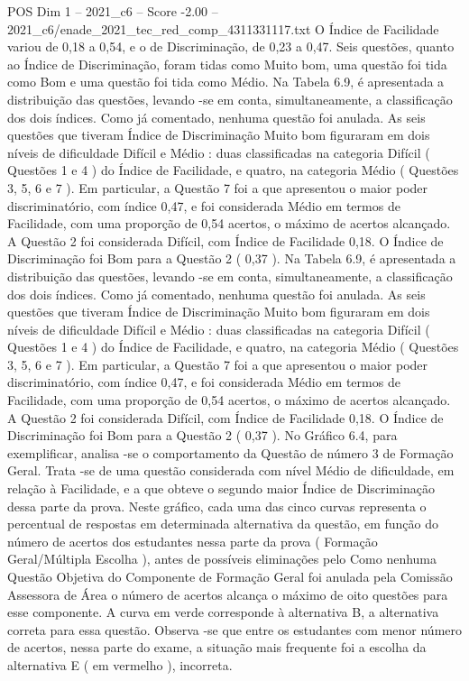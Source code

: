\begin{textsample}{POS Dim 1 – 2021\_c6 – Score -2.00 – 2021\_c6/enade\_2021\_tec\_red\_comp\_4311331117.txt}
O Índice de Facilidade variou de 0,18 a 0,54, e o de Discriminação, de 0,23 a 0,47.
Seis questões, quanto ao Índice de Discriminação, foram tidas como Muito bom, uma questão foi tida como Bom e uma questão foi tida como Médio.
Na Tabela 6.9, é apresentada a distribuição das questões, levando -se em conta, simultaneamente, a classificação dos dois índices.
Como já comentado, nenhuma questão foi anulada.
As seis questões que tiveram Índice de Discriminação Muito bom figuraram em dois níveis de dificuldade Difícil e Médio : duas classificadas na categoria Difícil ( Questões 1 e 4 ) do Índice de Facilidade, e quatro, na categoria Médio ( Questões 3, 5, 6 e 7 ).
Em particular, a Questão 7 foi a que apresentou o maior poder discriminatório, com índice 0,47, e foi considerada Médio em termos de Facilidade, com uma proporção de 0,54 acertos, o máximo de acertos alcançado.
A Questão 2 foi considerada Difícil, com Índice de Facilidade 0,18.
O Índice de Discriminação foi Bom para a Questão 2 ( 0,37 ).
Na Tabela 6.9, é apresentada a distribuição das questões, levando -se em conta, simultaneamente, a classificação dos dois índices.
Como já comentado, nenhuma questão foi anulada.
As seis questões que tiveram Índice de Discriminação Muito bom figuraram em dois níveis de dificuldade Difícil e Médio : duas classificadas na categoria Difícil ( Questões 1 e 4 ) do Índice de Facilidade, e quatro, na categoria Médio ( Questões 3, 5, 6 e 7 ).
Em particular, a Questão 7 foi a que apresentou o maior poder discriminatório, com índice 0,47, e foi considerada Médio em termos de Facilidade, com uma proporção de 0,54 acertos, o máximo de acertos alcançado.
A Questão 2 foi considerada Difícil, com Índice de Facilidade 0,18.
O Índice de Discriminação foi Bom para a Questão 2 ( 0,37 ).
No Gráfico 6.4, para exemplificar, analisa -se o comportamento da Questão de número 3 de Formação Geral.
Trata -se de uma questão considerada com nível Médio de dificuldade, em relação à Facilidade, e a que obteve o segundo maior Índice de Discriminação dessa parte da prova.
Neste gráfico, cada uma das cinco curvas representa o percentual de respostas em determinada alternativa da questão, em função do número de acertos dos estudantes nessa parte da prova ( Formação Geral/Múltipla Escolha ), antes de possíveis eliminações pelo Como nenhuma Questão Objetiva do Componente de Formação Geral foi anulada pela Comissão Assessora de Área o número de acertos alcança o máximo de oito questões para esse componente.
A curva em verde corresponde à alternativa B, a alternativa correta para essa questão.
Observa -se que entre os estudantes com menor número de acertos, nessa parte do exame, a situação mais frequente foi a escolha da alternativa E ( em vermelho ), incorreta.

\end{textsample}
